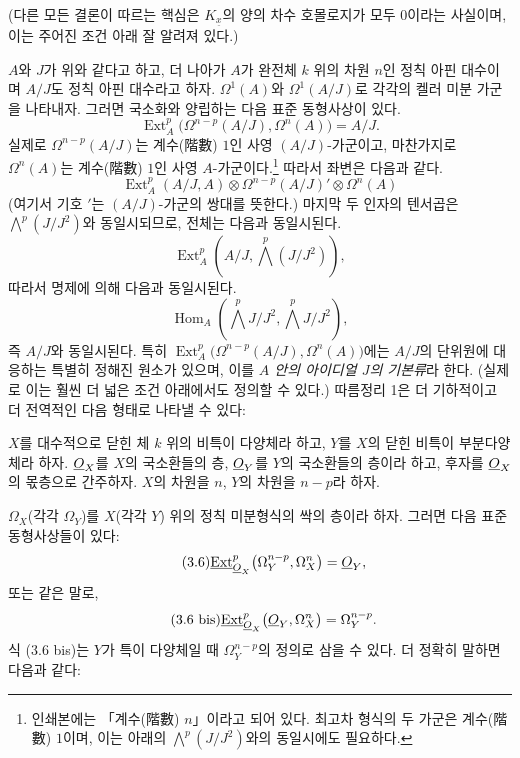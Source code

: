 (다른 모든 결론이 따르는 핵심은 $K_{\underline{x}}$의 양의 차수
호몰로지가 모두 $0$이라는 사실이며, 이는 주어진 조건 아래 잘 알려져 있다.)

 $A$와 $J$가 위와 같다고 하고, 더 나아가
$A$가 완전체 $k$ 위의 차원 $n$인 정칙 아핀 대수이며
$A/J$도 정칙 아핀 대수라고 하자. $\Omega^{1}(A)$와
$\Omega^{1}(A/J)$로 각각의 켈러 미분 가군을 나타내자. 그러면
국소화와 양립하는 다음 표준 동형사상이 있다.
\begin{equation}\tag{3.5}
  \operatorname{Ext}_{A}^{p}\bigl(\Omega^{n-p}(A/J),\Omega^{n}(A)\bigr)=A/J.
\end{equation}
실제로 $\Omega^{n-p}(A/J)$는 계수(階數) $1$인 사영 $(A/J)$-가군이고, 마찬가지로
$\Omega^{n}(A)$는 계수(階數) $1$인 사영 $A$-가군이다.\footnote{인쇄본에는
「계수(階數) $n$」이라고 되어 있다. 최고차 형식의 두 가군은 계수(階數)
$1$이며, 이는 아래의 $\bigwedge^{p}(J/J^{2})$와의 동일시에도 필요하다.}
따라서 좌변은 다음과 같다.
\[
  \operatorname{Ext}_{A}^{p}(A/J,A)
  \otimes\Omega^{n-p}(A/J)'\otimes\Omega^{n}(A)
\]
(여기서 기호 $'$는 $(A/J)$-가군의 쌍대를 뜻한다.) 마지막 두 인자의
텐서곱은 $\bigwedge^{p}(J/J^{2})$와 동일시되므로, 전체는
다음과 동일시된다.
\[
  \operatorname{Ext}_{A}^{p}\!\left(A/J,\bigwedge^{p}(J/J^{2})\right),
\]
따라서 명제에 의해 다음과 동일시된다.
\[
  \operatorname{Hom}_{A}\!\left(\bigwedge^{p}J/J^{2},
  \bigwedge^{p}J/J^{2}\right),
\]
즉 $A/J$와 동일시된다. 특히
$\operatorname{Ext}_{A}^{p}\bigl(\Omega^{n-p}(A/J),\Omega^{n}(A)\bigr)$에는
$A/J$의 단위원에 대응하는 특별히 정해진 원소가 있으며, 이를
\emph{$A$ 안의 아이디얼 $J$의 기본류}라 한다. (실제로 이는
훨씬 더 넓은 조건 아래에서도 정의할 수 있다.) 따름정리 1은
더 기하적이고 더 전역적인 다음 형태로 나타낼 수 있다:

 $X$를 대수적으로 닫힌 체 $k$ 위의 비특이
다양체라 하고, $Y$를 $X$의 닫힌 비특이 부분다양체라 하자.
$\underline{O}_X$를 $X$의 국소환들의 층, $\underline{O}_Y$를 $Y$의 국소환들의 층이라
하고, 후자를 $\underline{O}_X$의 몫층으로 간주하자. $X$의 차원을 $n$,
$Y$의 차원을 $n-p$라 하자.

$\Omega_X$(각각 $\Omega_Y$)를 $X$(각각 $Y$) 위의 정칙
미분형식의 싹의 층이라 하자. 그러면 다음 표준 동형사상들이
있다:
\begin{equation}\tag{3.6}
  \underline{\operatorname{Ext}}_{\underline{O}_X}^{p}\bigl(\Omega_Y^{n-p},\Omega_X^{n}\bigr)=\underline{O}_Y,
\end{equation}
또는 같은 말로,
\begin{equation}\tag{3.6 bis}
  \underline{\operatorname{Ext}}_{\underline{O}_X}^{p}\bigl(\underline{O}_Y,\Omega_X^{n}\bigr)=\Omega_Y^{n-p}.
\end{equation}
식 (3.6 bis)는 $Y$가 특이 다양체일 때 $\Omega_Y^{n-p}$의 정의로
삼을 수 있다. 더 정확히 말하면 다음과 같다:

